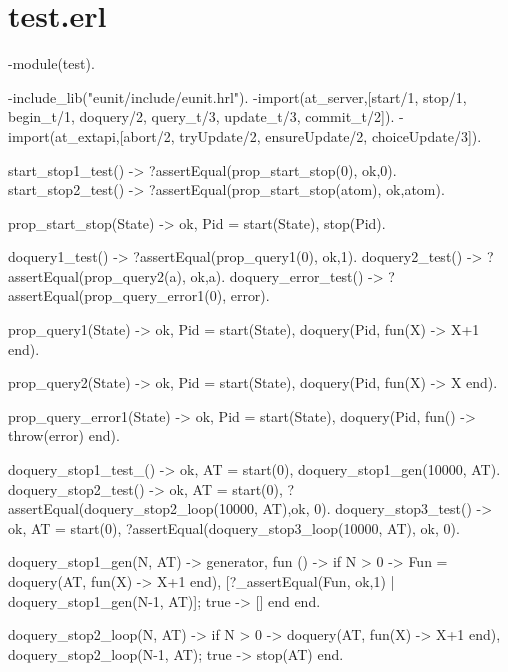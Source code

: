 \documentclass[11pt]{article}
\renewenvironment{verbatim}{}{}
\begin{document}
\section{test.erl}
\begin{verbatim}
\begin{verbatim}
-module(test).

-include_lib("eunit/include/eunit.hrl").
-import(at_server,[start/1, stop/1, begin_t/1, doquery/2, query_t/3, update_t/3, commit_t/2]).
-import(at_extapi,[abort/2, tryUpdate/2, ensureUpdate/2, choiceUpdate/3]).


%%% Test start and stop %%%
start_stop1_test() -> ?assertEqual(prop_start_stop(0), {ok,0}).
start_stop2_test() -> ?assertEqual(prop_start_stop(atom), {ok,atom}).

%
prop_start_stop(State) -> 
    {ok, Pid} = start(State),
    stop(Pid).

%%% Test doquery %%%
doquery1_test() -> ?assertEqual(prop_query1(0), {ok,1}).
doquery2_test() -> ?assertEqual(prop_query2(a), {ok,a}).
doquery_error_test() -> ?assertEqual(prop_query_error1(0), error).

%
prop_query1(State) -> 
    {ok, Pid} = start(State),
    doquery(Pid, fun(X) -> X+1 end).

prop_query2(State) -> 
    {ok, Pid} = start(State),
    doquery(Pid, fun(X) -> X end).

prop_query_error1(State) -> 
    {ok, Pid} = start(State),
    doquery(Pid, fun() -> throw(error) end).

%%% Test doquery and stop (not touching state) %%%
doquery_stop1_test_() -> %Does not crash after multiple calls
        {ok, AT} = start(0),
        doquery_stop1_gen(10000, AT).
doquery_stop2_test() -> %Not touching state
        {ok, AT} = start(0),
        ?assertEqual(doquery_stop2_loop(10000, AT),{ok, 0}).
doquery_stop3_test() -> %Errorfull queries do not touch the state
        {ok, AT} = start(0),
        ?assertEqual(doquery_stop3_loop(10000, AT), {ok, 0}). 

%
doquery_stop1_gen(N, AT) ->
   {generator,
    fun () ->
        if N > 0 ->
               Fun = doquery(AT, fun(X) -> X+1 end),
               [?_assertEqual(Fun, {ok,1})
                | doquery_stop1_gen(N-1, AT)];
           true ->
               []
        end
    end}.

doquery_stop2_loop(N, AT) ->
    if N > 0 ->
           doquery(AT, fun(X) -> X+1 end),
           doquery_stop2_loop(N-1, AT);
       true ->
           stop(AT)
    end.


\end{verbatim}
\end{document}
